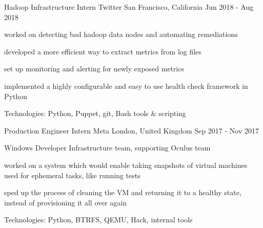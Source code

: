 \begin{cventries}
  \cventry
    {Hadoop Infrastructure Intern} %
    {Twitter} %
    {San Francisco, California} %
    {Jun 2018 - Aug 2018} %
    {
      \begin{cvitems} %
        \item {worked on detecting bad hadoop data nodes and automating remediations}
        \item {developed a more efficient way to extract metrics from log files}
        \item {set up monitoring and alerting for newly exposed metrics}
        \item {implemented a highly configurable and easy to use health check framework in Python}
        \item {Technologies: Python, Puppet, git, Bash tools \& scripting}
      \end{cvitems}
    }

  \cventry
    {Production Engineer Intern} %
    {Meta} %
    {London, United Kingdom} %
    {Sep 2017 - Nov 2017} %
    {
      \begin{cvitems} %
        \item {Windows Developer Infrastructure team, supporting Oculus team}
        \item {worked on a system which would enable taking snapshots of virtual machines used for ephemeral tasks, like running tests}
        \item {sped up the process of cleaning the VM and returning it to a healthy state, instead of provisioning it all over again}
        \item {Technologies: Python, BTRFS, QEMU, Hack, internal tools}
      \end{cvitems}
    }


\end{cventries}
